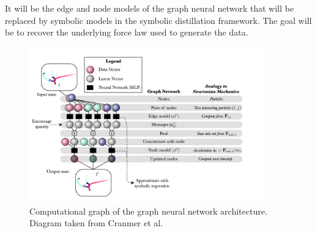 \documentclass[11pt]{article}
\begin{document}
It will be the edge and node models of the graph neural network that will be replaced by symbolic models in the symbolic distillation framework. The goal will be to recover the underlying force law used to generate the data.
\begin{figure}[H]
    \centering
    \includegraphics[width=0.9\textwidth]{figs/gnn_diagram.png}
    \caption{Computational graph of the graph neural network architecture. Diagram taken from Cranmer et al. \cite{cranmer2020discovering}}
    \label{fig:gnn}
\end{figure}

\end{document}

